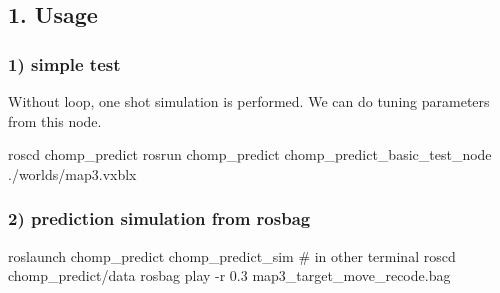 \subsection*{1. Usage}

\subsubsection*{1) simple test}

Without loop, one shot simulation is performed. We can do tuning parameters from this node.


\begin{DoxyCode}
roscd chomp\_predict
rosrun chomp\_predict chomp\_predict\_basic\_test\_node ./worlds/map3.vxblx 
\end{DoxyCode}


\subsubsection*{2) prediction simulation from rosbag}


\begin{DoxyCode}
roslaunch chomp\_predict chomp\_predict\_sim 
\textcolor{preprocessor}{# in other terminal }
roscd chomp\_predict/data
rosbag play -r 0.3 map3\_target\_move\_recode.bag
\end{DoxyCode}
 